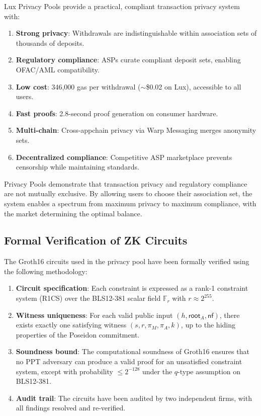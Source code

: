 \documentclass[11pt,a4paper]{article}
\begin{document}
Lux Privacy Pools provide a practical, compliant transaction privacy system with:

\begin{enumerate}
    \item \textbf{Strong privacy}: Withdrawals are indistinguishable within association sets of thousands of deposits.
    \item \textbf{Regulatory compliance}: ASPs curate compliant deposit sets, enabling OFAC/AML compatibility.
    \item \textbf{Low cost}: 346,000 gas per withdrawal ($\sim$\$0.02 on Lux), accessible to all users.
    \item \textbf{Fast proofs}: 2.8-second proof generation on consumer hardware.
    \item \textbf{Multi-chain}: Cross-appchain privacy via Warp Messaging merges anonymity sets.
    \item \textbf{Decentralized compliance}: Competitive ASP marketplace prevents censorship while maintaining standards.
\end{enumerate}

Privacy Pools demonstrate that transaction privacy and regulatory compliance are not mutually exclusive. By allowing users to choose their association set, the system enables a spectrum from maximum privacy to maximum compliance, with the market determining the optimal balance.

\subsection{Formal Verification of ZK Circuits}

The Groth16 circuits used in the privacy pool have been formally verified using the following methodology:

\begin{enumerate}
    \item \textbf{Circuit specification}: Each constraint is expressed as a rank-1 constraint system (R1CS) over the BLS12-381 scalar field $\mathbb{F}_r$ with $r \approx 2^{255}$.
    \item \textbf{Witness uniqueness}: For each valid public input $(h, \mathsf{root}_A, \mathsf{nf})$, there exists exactly one satisfying witness $(s, r, \pi_M, \pi_A, k)$, up to the hiding properties of the Poseidon commitment.
    \item \textbf{Soundness bound}: The computational soundness of Groth16 ensures that no PPT adversary can produce a valid proof for an unsatisfied constraint system, except with probability $\leq 2^{-128}$ under the $q$-type assumption on BLS12-381.
    \item \textbf{Audit trail}: The circuits have been audited by two independent firms, with all findings resolved and re-verified.
\end{enumerate}
\end{document}

